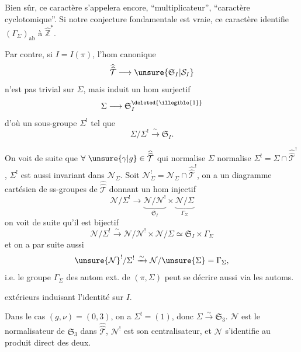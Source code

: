 
Bien sûr, ce caractère s'appelera encore, ``multiplicateur'',  ``caractère cyclotomique''.  Si notre conjecture fondamentale est vraie, ce caractère identifie $(\Gamma_\Sigma)_{\mathrm{ab}}$ à $\widehat{\mathbb Z}^{*}$.

Par contre, si $I=I(\pi)$, l'hom canonique
\[
\widehat{\widehat{\mathcal T}}\longrightarrow\unsure{\mathfrak S_I|\mathcal S_I}
\]
n'est  pas trivial sur $\Sigma$, mais induit un hom surjectif
\[
\Sigma\longrightarrow\mathfrak S_I^{\deleted{\illegible{1}}}
\]
d'où un sous-groupe $\Sigma^!$ tel que
\[
\Sigma/\Sigma^!\xrightarrow{\sim}\mathfrak S_I.
\]

On voit de suite que $\forall\ \unsure{\gamma|g}\in\widehat{\widehat{\mathcal T}}$ qui normalise $\Sigma$ normalise $\Sigma^!=\Sigma\cap\widehat{\widehat{\mathcal T}}^!$,  $\Sigma^!$ est aussi invariant dans $\mathcal N_\Sigma$.  Soit $\mathcal N_\Sigma^!=\mathcal N_\Sigma\cap\widehat{\widehat{\mathcal T}}^!$, on a un diagramme cartésien de ss-groupes de $\widehat{\widehat{\mathcal T}}$
donnant un hom injectif
\[
\mathcal N/\Sigma^!\longrightarrow
\underbrace{\mathcal N/\mathcal N^!}_{\mathfrak S_I}\times
\underbrace{\mathcal N/\Sigma}_{\Gamma_\Sigma}
\]
 on voit de suite qu'il est bijectif
\[
\mathcal N/\Sigma^!\xrightarrow{\sim}\mathcal N/\mathcal N^!\times\mathcal N/\Sigma\simeq\mathfrak S_I\times\Gamma_\Sigma
\]
et on a par suite aussi
\[
\unsure{\mathcal N}^!/\Sigma^!\xrightarrow{\sim}\mathcal N/\unsure{\Sigma}=\Gamma_\Sigma,
\]
i.e. le groupe $\Gamma_\Sigma$ des autom  ext. de $(\pi,\Sigma)$ peut se décrire aussi via les automs.


extérieurs induisant l'identité sur $I$.

Dans le cas $(g,\nu)=(0,3)$, on a $\Sigma^!=(1)$, \unsure{$\Rightarrow$} donc $\Sigma\xrightarrow{\sim}\mathfrak S_3$. $\mathcal N$ est le  normalisateur de $\mathfrak S_3$ dans $\widehat{\widehat{\mathcal T}}$, $\mathcal N^!$ \inserted{$\unsure{\xrightarrow{\sim}}\Gamma_\Sigma$} est son centralisateur, et $\mathcal N$ s'identifie au produit direct des deux.


